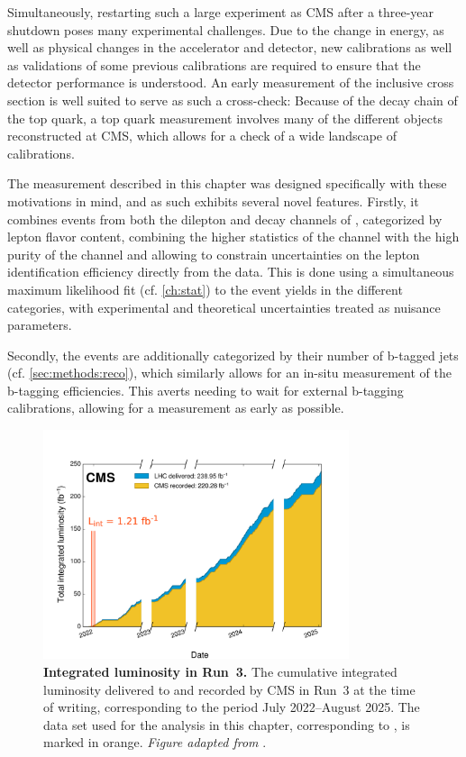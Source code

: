 Simultaneously, restarting such a large experiment as CMS after a three-year shutdown poses many experimental challenges. Due to the change in energy, as well as physical changes in the accelerator and detector, new calibrations as well as validations of some previous calibrations are required to ensure that the detector performance is understood. An early measurement of the inclusive \ttbar cross section is well suited to serve as such a cross-check: Because of the decay chain of the top quark, a top quark measurement involves many of the different objects reconstructed at CMS, which
allows for a check of a wide landscape of calibrations.

The measurement described in this chapter was designed specifically with these motivations in mind, and as such exhibits several novel features. Firstly, it combines events from both the dilepton and \ljets decay channels of \ttbar, categorized by lepton flavor content, combining the higher statistics of the \ljets channel with the high purity of the \emu channel and allowing to constrain uncertainties on the lepton identification efficiency directly from the data. This is done using a simultaneous maximum likelihood fit (cf. \cref{ch:stat}) to the event yields in the different categories, with experimental and theoretical uncertainties treated as nuisance parameters.

Secondly, the events are additionally categorized by their number of b-tagged jets (cf. \cref{sec:methods:reco}), which similarly allows for an in-situ measurement of the b-tagging efficiencies. This averts needing to wait for external b-tagging calibrations, allowing for a measurement as early as possible.

\begin{figure}[!t]
    \centering
    \includegraphics[width=0.8\textwidth]{figures/ttxs/lumiplot_thesis.pdf}
    \caption{\textbf{Integrated luminosity in Run~3.} The cumulative integrated luminosity delivered to and recorded by CMS in Run~3 at the time of writing, corresponding to the period July 2022--August 2025. The data set used for the analysis in this chapter, corresponding to \lumiRIII, is marked in orange. \textit{Figure adapted from }.}
    \label{fig:ttxs:lumi}
\end{figure}

